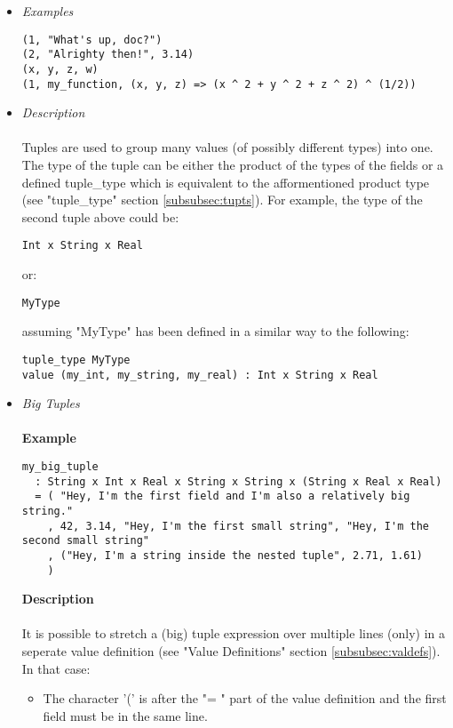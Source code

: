 \documentclass{article}
\begin{document}
\begin{itemize}

\item \textit{Examples}
\begin{verbatim}
(1, "What's up, doc?")
(2, "Alrighty then!", 3.14)
(x, y, z, w)
(1, my_function, (x, y, z) => (x ^ 2 + y ^ 2 + z ^ 2) ^ (1/2))
\end{verbatim}

\item \textit{Description} \\\\
Tuples are used to group many values (of possibly different types) into one.
The type of the tuple can be either the product of the types of the fields or a
defined tuple\_type which is equivalent to the afformentioned product type (see
"tuple\_type" section \ref{subsubsec:tupts}). For example, the type of the
second tuple above could be:
\begin{verbatim}
Int x String x Real
\end{verbatim}
or:
\begin{verbatim}
MyType
\end{verbatim}
assuming "MyType" has been defined in a similar way to the following:
\begin{verbatim}
tuple_type MyType
value (my_int, my_string, my_real) : Int x String x Real
\end{verbatim}

\item \textit{Big Tuples} \\\\
\textbf{Example}
\begin{verbatim}
my_big_tuple
  : String x Int x Real x String x String x (String x Real x Real)
  = ( "Hey, I'm the first field and I'm also a relatively big string."
    , 42, 3.14, "Hey, I'm the first small string", "Hey, I'm the second small string"
    , ("Hey, I'm a string inside the nested tuple", 2.71, 1.61)
    )
\end{verbatim}

\textbf{Description} \\\\
It is possible to stretch a (big) tuple expression over multiple lines (only)
in a seperate value definition (see "Value Definitions" section
\ref{subsubsec:valdefs}).  In that case:
\begin{itemize}
\item
The character '(' is after the "= " part of the value definition
and the first field must be in the same line.


\end{itemize}
\end{itemize}
\end{document}
